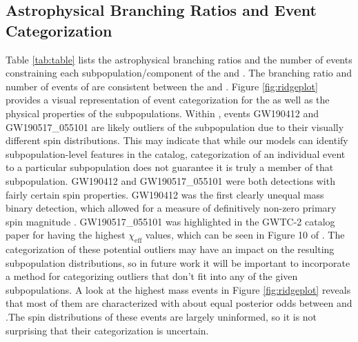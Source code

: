 \subsection{Astrophysical Branching Ratios and Event Categorization}

Table \ref{tab:table} lists the astrophysical branching ratios and the number of events constraining each subpopulation/component of the \base{} and \comp{}. The branching ratio and number of events of \first{} are consistent between the \base{} and \comp{}. Figure \ref{fig:ridgeplot} provides a visual representation of event categorization for the \comp{} as well as the physical properties of the subpopulations. Within \contA{}, events GW190412 and GW190517\_055101 are likely outliers of the subpopulation due to their visually different spin distributions. This may indicate that while our models can identify subpopulation-level features in the catalog, categorization of an individual event to a particular subpopulation does not guarantee it is truly a member of that subpopulation. GW190412 and GW190517\_055101 were both detections with fairly certain spin properties. GW190412 was the first clearly unequal mass binary detection, which allowed for a measure of definitively non-zero primary spin magnitude \citep{10.3847/2041-8213/aba8ef, 2021PhRvX..11b1053A}. GW190517\_055101 was highlighted in the GWTC-2 catalog paper \citet{2021PhRvX..11b1053A} for having the highest $\chi_\text{eff}$ values, which can be seen in Figure 10 of \citet{2021PhRvX..11b1053A}. The categorization of these potential outliers may have an impact on the resulting subpopulation distributions, so in future work it will be important to incorporate a method for categorizing outliers that don't fit into any of the given subpopulations. A look at the highest mass events in Figure \ref{fig:ridgeplot} reveals that most of them are characterized with about equal posterior odds between \contA{} and \contB{}.The spin distributions of these events are largely uninformed, so it is not surprising that their categorization is uncertain.

